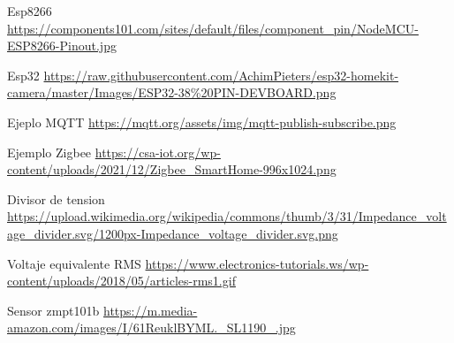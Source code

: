 \begin{thebibliography}{9}
Esp8266 \url{https://components101.com/sites/default/files/component_pin/NodeMCU-ESP8266-Pinout.jpg}

Esp32 \url{https://raw.githubusercontent.com/AchimPieters/esp32-homekit-camera/master/Images/ESP32-38%20PIN-DEVBOARD.png}

Ejeplo MQTT \url{https://mqtt.org/assets/img/mqtt-publish-subscribe.png}

Ejemplo Zigbee \url{https://csa-iot.org/wp-content/uploads/2021/12/Zigbee_SmartHome-996x1024.png}

Divisor de tension \url{https://upload.wikimedia.org/wikipedia/commons/thumb/3/31/Impedance_voltage_divider.svg/1200px-Impedance_voltage_divider.svg.png}

Voltaje equivalente RMS \url{https://www.electronics-tutorials.ws/wp-content/uploads/2018/05/articles-rms1.gif}

 Sensor zmpt101b \url{https://m.media-amazon.com/images/I/61ReuklBYML._SL1190_.jpg}

\end{thebibliography}

